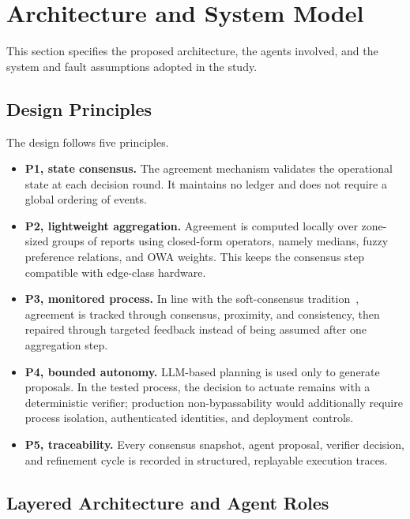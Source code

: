 \documentclass[smartcities,article,submit,moreauthors]{Definitions/mdpi}
\begin{document}
\section{Architecture and System Model}
\label{sec:architecture}

This section specifies the proposed architecture, the agents involved,
and the system and fault assumptions adopted in the study.

\subsection{Design Principles}
\label{sec:principles}

The design follows five principles.

\begin{itemize}
\item \textbf{P1, state consensus.} The agreement mechanism validates the
operational state at each decision round. It maintains no ledger and does
not require a global ordering of events.
\item \textbf{P2, lightweight aggregation.} Agreement is computed locally
over zone-sized groups of reports using closed-form operators, namely
medians, fuzzy preference relations, and OWA weights. This keeps the
consensus step compatible with edge-class hardware.
\item \textbf{P3, monitored process.} In line with the soft-consensus
tradition~\cite{herreraviedma2014}, agreement is tracked through
consensus, proximity, and consistency, then repaired through targeted
feedback instead of being assumed after one aggregation step.
\item \textbf{P4, bounded autonomy.} LLM-based planning is used only to
generate proposals. In the tested process, the decision to actuate remains
with a deterministic verifier; production non-bypassability would additionally
require process isolation, authenticated identities, and deployment controls.
\item \textbf{P5, traceability.} Every consensus snapshot, agent
proposal, verifier decision, and refinement cycle is recorded in
structured, replayable execution traces.
\end{itemize}

\subsection{Layered Architecture and Agent Roles}
\label{sec:layers}
\end{document}
